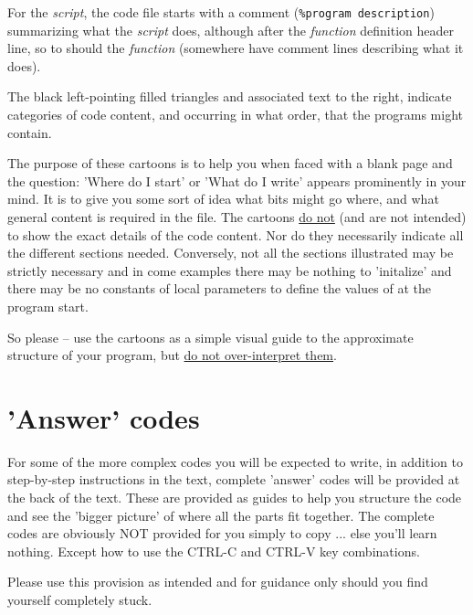 \documentclass{tufte-book} %
\begin{document}
For the \textit{script}, the code file starts with a comment (\textcolor[rgb]{0,0.501961,0}{\texttt{\%program description}}) summarizing what the \textit{script} does, although after the \textit{function} definition header line, so to should the \textit{function} (somewhere have comment lines describing what it does).

The black left-pointing filled triangles and associated text to the right, indicate categories of code content, and occurring in what order, that the programs might contain.

The purpose of these cartoons is to help you when faced with a blank page and the question: 'Where do I start' or 'What do I write' appears prominently in your mind. It is to give you some sort of idea what bits might go where, and what general content is required in the file. The cartoons \uline{do not} (and are not intended) to show the exact details of the code content. Nor do they necessarily indicate all the different sections needed. Conversely, not all the sections illustrated may be strictly necessary and in come examples there may be nothing to 'initalize' and there may be no constants of local parameters to define the values of at the program start.

So please -- use the cartoons as a simple visual guide to the approximate structure of your program, but \uline{do not over-interpret them}.


\section{'Answer' codes}

For some of the more complex codes you will be expected to write, in addition to step-by-step instructions in the text, complete 'answer' codes will be provided at the back of the text. These are provided as guides to help you structure the code and see the 'bigger picture' of where all the parts fit together. The complete codes are obviously NOT provided for you simply to copy ... else you'll learn nothing. Except how to use the \textsf{CTRL-C} and \textsf{CTRL-V} key combinations.

Please use this provision as intended and for guidance only should you find yourself completely stuck.

\end{document}
